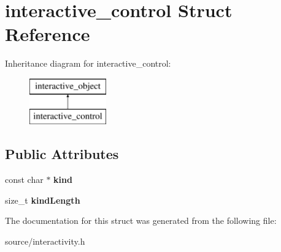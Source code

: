 \hypertarget{structinteractive__control}{}\section{interactive\+\_\+control Struct Reference}
\label{structinteractive__control}
Inheritance diagram for interactive\+\_\+control\+:\begin{figure}[H]
\begin{center}
\leavevmode
\includegraphics[height=2.000000cm]{structinteractive__control}
\end{center}
\end{figure}
\subsection*{Public Attributes}
\begin{DoxyCompactItemize}
\item 
\mbox{\label{structinteractive__control_a60e147a9d4ae7f433a8b6f21daf3d5b4}} 
const char $\ast$ {\bfseries kind}
\item 
\mbox{\label{structinteractive__control_a5b791bc356f723edcc3bd5c0e6a0365c}} 
size\+\_\+t {\bfseries kind\+Length}
\end{DoxyCompactItemize}


The documentation for this struct was generated from the following file\+:\begin{DoxyCompactItemize}
\item 
source/interactivity.\+h\end{DoxyCompactItemize}

